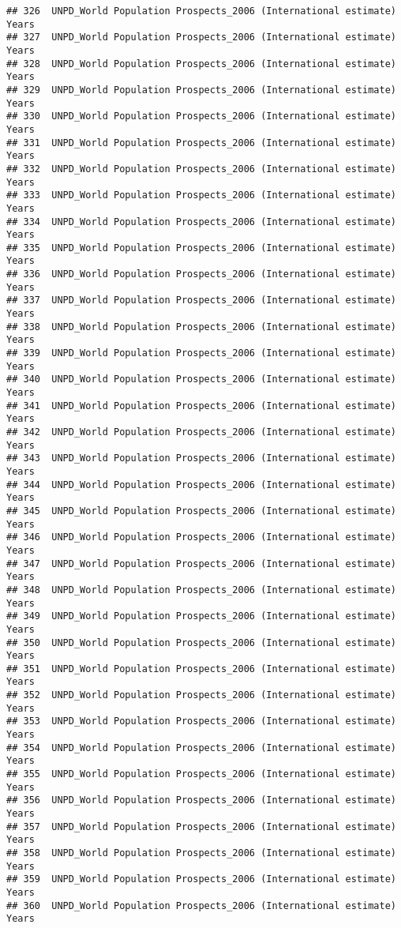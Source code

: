 \documentclass[]{article}
\begin{document}
\begin{verbatim}
## 326  UNPD_World Population Prospects_2006 (International estimate) Years
## 327  UNPD_World Population Prospects_2006 (International estimate) Years
## 328  UNPD_World Population Prospects_2006 (International estimate) Years
## 329  UNPD_World Population Prospects_2006 (International estimate) Years
## 330  UNPD_World Population Prospects_2006 (International estimate) Years
## 331  UNPD_World Population Prospects_2006 (International estimate) Years
## 332  UNPD_World Population Prospects_2006 (International estimate) Years
## 333  UNPD_World Population Prospects_2006 (International estimate) Years
## 334  UNPD_World Population Prospects_2006 (International estimate) Years
## 335  UNPD_World Population Prospects_2006 (International estimate) Years
## 336  UNPD_World Population Prospects_2006 (International estimate) Years
## 337  UNPD_World Population Prospects_2006 (International estimate) Years
## 338  UNPD_World Population Prospects_2006 (International estimate) Years
## 339  UNPD_World Population Prospects_2006 (International estimate) Years
## 340  UNPD_World Population Prospects_2006 (International estimate) Years
## 341  UNPD_World Population Prospects_2006 (International estimate) Years
## 342  UNPD_World Population Prospects_2006 (International estimate) Years
## 343  UNPD_World Population Prospects_2006 (International estimate) Years
## 344  UNPD_World Population Prospects_2006 (International estimate) Years
## 345  UNPD_World Population Prospects_2006 (International estimate) Years
## 346  UNPD_World Population Prospects_2006 (International estimate) Years
## 347  UNPD_World Population Prospects_2006 (International estimate) Years
## 348  UNPD_World Population Prospects_2006 (International estimate) Years
## 349  UNPD_World Population Prospects_2006 (International estimate) Years
## 350  UNPD_World Population Prospects_2006 (International estimate) Years
## 351  UNPD_World Population Prospects_2006 (International estimate) Years
## 352  UNPD_World Population Prospects_2006 (International estimate) Years
## 353  UNPD_World Population Prospects_2006 (International estimate) Years
## 354  UNPD_World Population Prospects_2006 (International estimate) Years
## 355  UNPD_World Population Prospects_2006 (International estimate) Years
## 356  UNPD_World Population Prospects_2006 (International estimate) Years
## 357  UNPD_World Population Prospects_2006 (International estimate) Years
## 358  UNPD_World Population Prospects_2006 (International estimate) Years
## 359  UNPD_World Population Prospects_2006 (International estimate) Years
## 360  UNPD_World Population Prospects_2006 (International estimate) Years

\end{verbatim}
\end{document}

